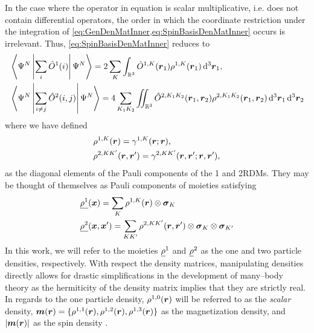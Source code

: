 In the case where the operator in equation is scalar multiplicative, i.e. does not contain differential operators, 
the order in which the coordinate restriction under the integration of \cref{eq:GenDenMatInner,eq:SpinBasisDenMatInner} 
occurs is irrelevant. Thus, \cref{eq:SpinBasisDenMatInner} reduces to \cite{Yang89_book}
\begin{subequations}
\begin{align}
&\left\langle \Psi^N \left\vert \sum_i \hat{O}^1(i) \right\vert \Psi^N \right\rangle = 2 \sum_K \int_{\mathbb R^3}  \hat{O}^{1,K}(\boldsymbol{r}_1) \rho^{1,K}(\boldsymbol{r}_1) 
  \,\mathrm{d}^3\boldsymbol{r}_1,\\
&\left\langle \Psi^N \left\vert \sum_{i\neq j} \hat{O}^2(i,j) \right\vert \Psi^N \right\rangle = 4 \sum_{K_1 K_2} \int\mkern-12mu\int_{\mathbb R^3} 
  \hat{O}^{2,K_1K_2}(\boldsymbol{r}_1,\boldsymbol{r}_2) \rho^{2,K_1 K_2}(\boldsymbol{r}_1,\boldsymbol{r}_2)\,\mathrm{d}^3\boldsymbol{r}_1 \,\mathrm{d}^3\boldsymbol{r}_2
\end{align}
\end{subequations}
where we have defined
\begin{subequations}
  \label{eq:SpinorDensity}
\begin{align}
&\rho^{1,K}(\boldsymbol{r}) = \gamma^{1,K}(\boldsymbol{r};\boldsymbol{r}),\\
&\rho^{2,KK'}(\boldsymbol{r},\boldsymbol{r}') = \gamma^{2,KK'}(\boldsymbol{r},\boldsymbol{r}';\boldsymbol{r},\boldsymbol{r}'),
\end{align}
\end{subequations}
as the diagonal elements of the Pauli components of the 1 and 2RDMs. They may be thought of themselves
as Pauli components of moieties satisfying
\begin{align}
&\underline{\rho^1}(\boldsymbol{x}) = \sum_K \rho^{1,K}(\boldsymbol{r}) \otimes \boldsymbol{\sigma}_{K}\\
&\underline{\rho^2}(\boldsymbol{x},\boldsymbol{x}') = \sum_{KK'} \rho^{2,KK'}(\boldsymbol{r},\boldsymbol{r}') \otimes \boldsymbol{\sigma}_{K}\otimes \boldsymbol{\sigma}_{K'}
\end{align} 
In this work, we will refer to
the moieties $\underline{\rho}^{1}$ and $\underline{\rho}^{2}$ as the  one and two particle
densities, respectively.  With respect the density matrices, manipulating densities directly 
allows for drastic simplifications in the development of many--body theory as the hermiticity
of the density matrix implies that they are strictly real. In regards to the one particle density,
$\rho^{1,0}(\boldsymbol{r})$ will be referred to as the \emph{scalar} density,
$\boldsymbol{m}(\boldsymbol{r}) = \{ \rho^{1,1}(\boldsymbol{r}), \rho^{1,2}(\boldsymbol{r}), \rho^{1,3}(\boldsymbol{r}) \}$ as the magnetization
density, and $\vert \boldsymbol{m}(\boldsymbol{r}) \vert$ as the spin density \cite{Wullen02_779}.





